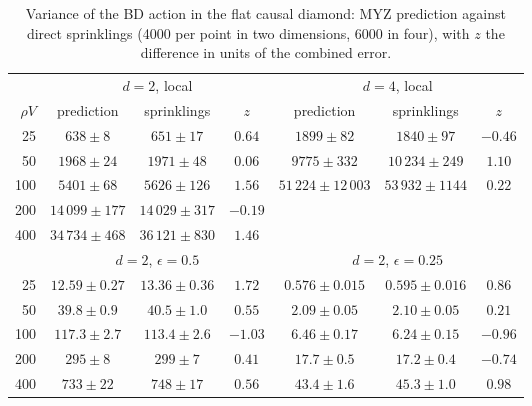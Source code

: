 \documentclass{iopjournal}
\newcommand{\rhoV}{\rho V}
\begin{document}
\begin{table}[htb]
\caption{\label{tab:validation}Variance of the BD action in the flat causal
diamond: MYZ prediction against direct sprinklings (4000 per point in two
dimensions, 6000 in four), with $z$ the difference in units of the combined
error.}
\centering
\begin{tabular}{@{}rcccccc}
\hline
 & \multicolumn{3}{c}{$d=2$, local} & \multicolumn{3}{c}{$d=4$, local}\\
$\rhoV$ & prediction & sprinklings & $z$ & prediction & sprinklings & $z$\\
\hline
25 & $638\pm8$ & $651\pm17$ & $0.64$ & $1899\pm82$ & $1840\pm97$ & $-0.46$\\
50 & $1968\pm24$ & $1971\pm48$ & $0.06$ & $9775\pm332$ & $10\,234\pm249$ & $1.10$\\
100 & $5401\pm68$ & $5626\pm126$ & $1.56$ & $51\,224\pm12\,003$ & $53\,932\pm1144$ & $0.22$\\
200 & $14\,099\pm177$ & $14\,029\pm317$ & $-0.19$ & & & \\
400 & $34\,734\pm468$ & $36\,121\pm830$ & $1.46$ & & & \\
\hline
 & \multicolumn{3}{c}{$d=2$, $\epsilon=0.5$} & \multicolumn{3}{c}{$d=2$, $\epsilon=0.25$}\\
\hline
25 & $12.59\pm0.27$ & $13.36\pm0.36$ & $1.72$ & $0.576\pm0.015$ & $0.595\pm0.016$ & $0.86$\\
50 & $39.8\pm0.9$ & $40.5\pm1.0$ & $0.55$ & $2.09\pm0.05$ & $2.10\pm0.05$ & $0.21$\\
100 & $117.3\pm2.7$ & $113.4\pm2.6$ & $-1.03$ & $6.46\pm0.17$ & $6.24\pm0.15$ & $-0.96$\\
200 & $295\pm8$ & $299\pm7$ & $0.41$ & $17.7\pm0.5$ & $17.2\pm0.4$ & $-0.74$\\
400 & $733\pm22$ & $748\pm17$ & $0.56$ & $43.4\pm1.6$ & $45.3\pm1.0$ & $0.98$\\
\hline
\end{tabular}
\end{table}



\end{document}
